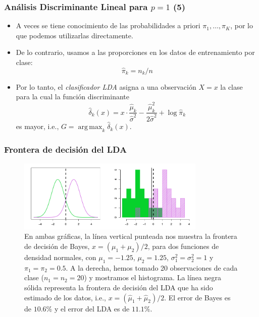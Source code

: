 \documentclass[usenames,dvipsnames]{beamer} %
\DeclareMathOperator*{\argmax}{arg\,max}
\newcommand\defi[1]{\textcolor{NavyBlue}{\textit{#1}}}
\begin{document}
\begin{frame}\frametitle{An\'alisis Discriminante Lineal para $p=1$ (5)}
\begin{itemize}
	\item A veces se tiene conocimiento de las probabilidades a priori $\pi_1, \dotsc, \pi_K$, por lo que podemos utilizarlas directamente.
	\item De lo contrario, usamos a las proporciones en los datos de entrenamiento por clase:
	\begin{equation}\label{eq:islr_4-16}
	\hat \pi_k = n_k/n
	\end{equation}
	\item Por lo tanto, el \defi{clasificador LDA} asigna a una observaci\'on $X=x$ la clase para la cual la funci\'on discriminante
	\begin{equation}\label{eq:islr_4-17}
	\hat \delta_k(x) = x\cdot \frac{\hat\mu_k}{\hat\sigma^2}-\frac{\hat\mu_k^2}{2\hat\sigma^2}+\log{\hat\pi_k}
	\end{equation}
	es mayor, i.e., $G = \argmax_k \hat \delta_k(x)$.
\end{itemize}
\end{frame}

\begin{frame}\frametitle{Frontera de decisi\'on del LDA}
\begin{figure}
	\centering
	\includegraphics[width=0.8\textwidth]{images/islr/fig_4_4.png}
	\caption{En ambas gr\'aficas, la l\'inea vertical punteada nos muestra la frontera de decisi\'on de Bayes, $x=(\mu_1 + \mu_2)/2$, para dos funciones de densidad normales, con $\mu_1=-1.25$, $\mu_2=1.25$, $\sigma_1^2=\sigma_2^2=1$ y $\pi_1=\pi_2=0.5$. A la derecha, hemos tomado 20 observaciones de cada clase ($n_1=n_2=20$) y mostramos el histograma. La l\'inea negra s\'olida representa la frontera de decisi\'on del LDA que ha sido estimado de los datos, i.e., $x=(\hat \mu_1 + \hat \mu_2)/2$. El error de Bayes es de $10.6\%$ y el error del LDA es de $11.1\%$.}
	\label{fig:islr_4-4}
\end{figure}
\end{frame}
\end{document}
